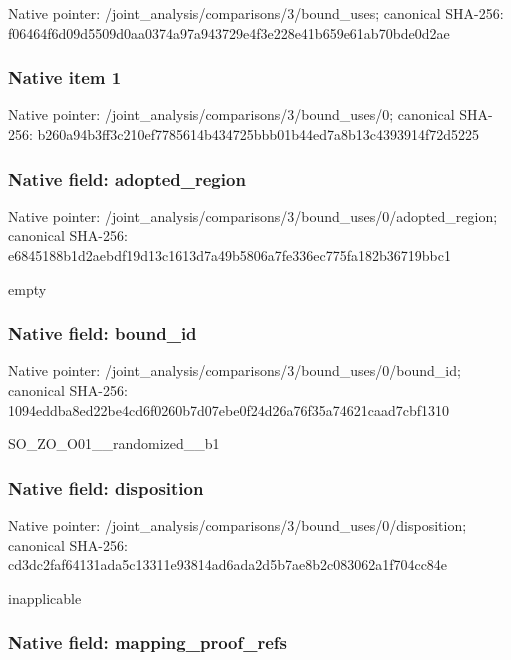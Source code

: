 \documentclass[10pt,a4paper]{article}
\begin{document}
Native pointer: /joint\_analysis/comparis\allowbreak{}ons/3/bound\_uses; canonical SHA-256: f06464f6d09d5509d0aa0374\allowbreak{}a97a943729e4f3e228e41b65\allowbreak{}9e61ab70bde0d2ae



\subsubsection{Native item 1}


Native pointer: /joint\_analysis/comparis\allowbreak{}ons/3/bound\_uses/0; canonical SHA-256: b260a94b3ff3c210ef778561\allowbreak{}4b434725bbb01b44ed7a8b13\allowbreak{}c4393914f72d5225



\subsubsection{Native field: adopted\_region}


Native pointer: /joint\_analysis/comparis\allowbreak{}ons/3/bound\_uses/0/adopt\allowbreak{}ed\_region; canonical SHA-256: e6845188b1d2aebdf19d13c1\allowbreak{}613d7a49b5806a7fe336ec77\allowbreak{}5fa182b36719bbc1


empty


\subsubsection{Native field: bound\_id}


Native pointer: /joint\_analysis/comparis\allowbreak{}ons/3/bound\_uses/0/bound\allowbreak{}\_id; canonical SHA-256: 1094eddba8ed22be4cd6f026\allowbreak{}0b7d07ebe0f24d26a76f35a7\allowbreak{}4621caad7cbf1310


SO\_ZO\_O01\_\_randomized\_\_b1


\subsubsection{Native field: disposition}


Native pointer: /joint\_analysis/comparis\allowbreak{}ons/3/bound\_uses/0/dispo\allowbreak{}sition; canonical SHA-256: cd3dc2faf64131ada5c13311\allowbreak{}e93814ad6ada2d5b7ae8b2c0\allowbreak{}83062a1f704cc84e


inapplicable


\subsubsection{Native field: mapping\_proof\_refs}
\end{document}
